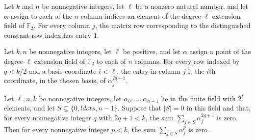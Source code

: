 \begin{theorem}
\label{FABL.reducedVandermondeBinaryMatrixOfPoints_constantRow}
\leanok
{}
Let $k$ and $n$ be nonnegative integers, let $\ell$ be a nonzero natural number, and let
$\alpha$ assign to each of the $n$ column indices an element of the degree-$\ell$
extension field of $\mathbb{F}_2$. For every column $j$, the matrix row corresponding to
the distinguished constant-row index has entry $1$.
\end{theorem}

\begin{theorem}
\label{FABL.reducedVandermondeBinaryMatrixOfPoints_oddPowerRow}
\leanok
{}
Let $k,n$ be nonnegative integers, let $\ell$ be positive, and let $\alpha$ assign a
point of the degree-$\ell$ extension field of $\mathbb{F}_2$ to each of $n$ columns. For
every row indexed by $q<k/2$ and a basis coordinate $i<\ell$, the entry in column $j$ is
the $i$th coordinate, in the chosen basis, of $\alpha_j^{2q+1}$.
\end{theorem}

\begin{theorem}
\label{FABL.extensionField_moments_eq_zero_of_oddMoments_eq_zero}
\leanok
{}
Let $\ell,n,k$ be nonnegative integers, let $\alpha_0,\ldots,\alpha_{n-1}$ lie in the
finite field with $2^\ell$ elements, and let $S\subseteq\{0,ldots,n-1\}$. Suppose that
$|S|=0$ in this field and that, for every nonnegative integer $q$ with $2q+1<k$, the sum
$\sum_{j\in S}\alpha_j^{2q+1}$ is zero. Then for every nonnegative integer $p<k$, the
sum $\sum_{j\in S}\alpha_j^p$ is zero.
\end{theorem}

